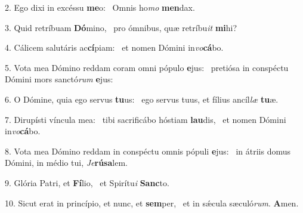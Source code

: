2. Ego dixi in excéssu \textbf{me}o: \ast\  Omnis ho\textit{mo} \textbf{men}dax.\

3. Quid retríbuam \textbf{Dó}mino, \ast\  pro ómnibus, quæ retríbu\textit{it} \textbf{mi}hi?\

4. Cálicem salutáris ac\textbf{cí}piam: \ast\  et nomen Dómini in\textit{vo}\textbf{cá}bo.\

5. Vota mea Dómino reddam coram omni pópulo \textbf{e}jus: \ast\  pretiósa in conspéctu Dómini mors sanctó\textit{rum} \textbf{e}jus:\

6. O Dómine, quia ego servus \textbf{tu}us: \ast\  ego servus tuus, et fílius ancíl\textit{læ} \textbf{tu}æ.\

7. Dirupísti víncula mea: \dag\  tibi sacrificábo hóstiam \textbf{lau}dis, \ast\  et nomen Dómini in\textit{vo}\textbf{cá}bo.\

8. Vota mea Dómino reddam in conspéctu omnis pópuli \textbf{e}jus: \ast\  in átriis domus Dómini, in médio tui, \textit{Je}\textbf{rú}\textbf{sa}lem.\

9. Glória Patri, et \textbf{Fí}lio, \ast\  et Spirítu\textit{i} \textbf{Sanc}to.\

10. Sicut erat in princípio, et nunc, et \textbf{sem}per, \ast\  et in sǽcula sæculó\textit{rum}. \textbf{A}men.\

